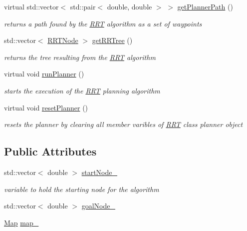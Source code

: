 \begin{DoxyCompactItemize}
virtual std\+::vector$<$ std\+::pair$<$ double, double $>$ $>$ \hyperlink{classRRT_a35e29366864cebacda5cd52c1febaa73}{get\+Planner\+Path} ()
\begin{DoxyCompactList}\small\item\em returns a path found by the \hyperlink{classRRT}{R\+RT} algorithm as a set of waypoints \end{DoxyCompactList}\item 
std\+::vector$<$ \hyperlink{classRRTNode}{R\+R\+T\+Node} $>$ \hyperlink{classRRT_aba9e08111e7b76cd72acf2d0d4d560ae}{get\+R\+R\+Tree} ()
\begin{DoxyCompactList}\small\item\em returns the tree resulting from the \hyperlink{classRRT}{R\+RT} algorithm \end{DoxyCompactList}\item 
virtual void \hyperlink{classRRT_a57a214360eb86fc63d7300bc1ea94fde}{run\+Planner} ()
\begin{DoxyCompactList}\small\item\em starts the execution of the \hyperlink{classRRT}{R\+RT} planning algorithm \end{DoxyCompactList}\item 
virtual void \hyperlink{classRRT_a952ef4be01547b013ce5c64d912fe680}{reset\+Planner} ()
\begin{DoxyCompactList}\small\item\em resets the planner by clearing all member varibles of \hyperlink{classRRT}{R\+RT} class planner object \end{DoxyCompactList}\end{DoxyCompactItemize}
\subsection*{Public Attributes}
\begin{DoxyCompactItemize}
\item 
std\+::vector$<$ double $>$ \hyperlink{classRRT_a97431b141ce0849f645625c1be1ac198}{start\+Node\+\_\+}\hypertarget{classRRT_a97431b141ce0849f645625c1be1ac198}{}\label{classRRT_a97431b141ce0849f645625c1be1ac198}

\begin{DoxyCompactList}\small\item\em variable to hold the starting node for the algorithm \end{DoxyCompactList}\item 
std\+::vector$<$ double $>$ \hyperlink{classRRT_a01f224deb0e405704d56735301dca404}{goal\+Node\+\_\+}
\item 
\hyperlink{classMap}{Map} \hyperlink{classRRT_a534fd15ee26c5680a17ee3528a9e9b20}{map\+\_\+}
\end{DoxyCompactItemize}



